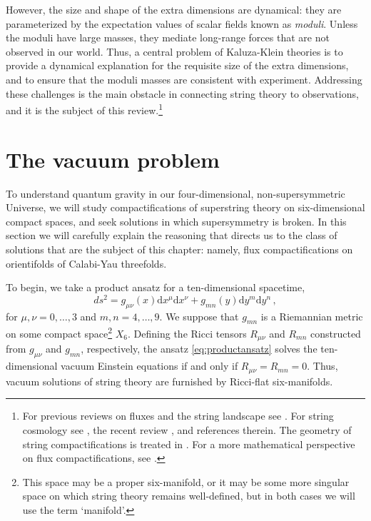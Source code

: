\documentclass[12pt,a4wide]{article}
\def\d{\mathrm{d}}
\begin{document}
However, the size and shape of the extra dimensions are dynamical: they are parameterized by the expectation values of scalar fields known as \emph{moduli}.
Unless the moduli have large masses, they mediate long-range forces that are not observed in our world.
Thus, a central problem of  Kaluza-Klein theories is to provide a dynamical explanation for the requisite size of the extra dimensions, and to ensure that the moduli masses are consistent with experiment.
Addressing these challenges is the main obstacle in connecting string theory to observations, and it is the subject of this review.\footnote{For previous reviews  on fluxes and the string landscape see \cite{Grana:2005jc,Douglas:2006es,Hebecker:2021egx}. For string cosmology see \cite{Baumann:2014nda}, the recent review \cite{Cicoli:2023opf}, and references therein.
The geometry of string compactifications is treated in \cite{Tomasiello:2022dwe}.
For a more mathematical perspective on flux compactifications, see \cite{MikeEMP}.}
 

\section{The vacuum problem}
 
To understand quantum gravity in our four-dimensional, non-supersymmetric Universe, we will study compactifications of superstring theory on six-dimensional compact spaces, and seek solutions in which supersymmetry is broken.
In this section we will carefully explain the reasoning that directs us to the class of solutions that are the subject of this chapter: namely, flux compactifications on orientifolds of Calabi-Yau threefolds.

To begin, we take a product ansatz for a ten-dimensional spacetime,
\begin{equation}\label{eq:productansatz}
 ds^2 = g_{\mu\nu}(x)\d x^{\mu}\d x^{\nu}+g_{mn}(y)\d y^m \d y^n\,,   
\end{equation} for $\mu,\nu = 0,\ldots,3$ and $m,n=4,\ldots,9$.  We suppose that $g_{mn}$ is a Riemannian metric on some compact space\footnote{This space may be a proper six-manifold, or it may be some more singular space on which string theory remains well-defined, but in both cases we will use the term `manifold'.} $X_6$. Defining the Ricci tensors $R_{\mu\nu}$ and $R_{mn}$ constructed from $g_{\mu\nu}$ and $g_{mn}$, respectively, the ansatz \eqref{eq:productansatz} solves the ten-dimensional vacuum Einstein equations if and only if  $R_{\mu\nu} = R_{mn} = 0$.  Thus, vacuum solutions of string theory are furnished by Ricci-flat six-manifolds.
\end{document}
